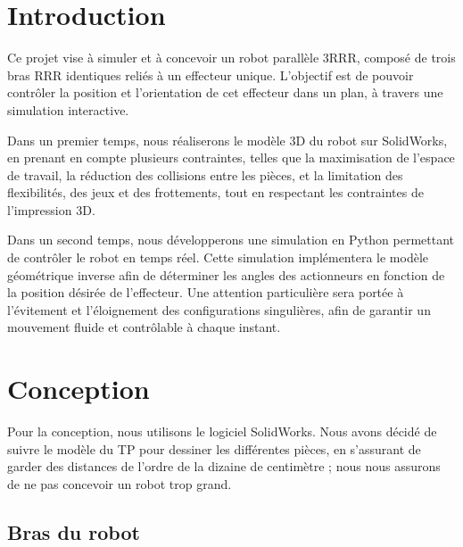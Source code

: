 \documentclass[a4paper, 11pt]{report}
\begin{document}

\clearpage\setcounter{page}{2}

\tableofcontents

\section*{Introduction}

Ce projet vise à simuler et à concevoir un robot parallèle 3RRR, composé de trois bras RRR identiques reliés à un effecteur unique. L'objectif est de pouvoir contrôler la position et l'orientation de cet effecteur dans un plan, à travers une simulation interactive.

Dans un premier temps, nous réaliserons le modèle 3D du robot sur SolidWorks, en prenant en compte plusieurs contraintes, telles que la maximisation de l'espace de travail, la réduction des collisions entre les pièces, et la limitation des flexibilités, des jeux et des frottements, tout en respectant les contraintes de l'impression 3D.

Dans un second temps, nous développerons une simulation en Python permettant de contrôler le robot en temps réel. Cette simulation implémentera le modèle géométrique inverse afin de déterminer les angles des actionneurs en fonction de la position désirée de l'effecteur. Une attention particulière sera portée à l'évitement et l'éloignement des configurations singulières, afin de garantir un mouvement fluide et contrôlable à chaque instant.

\section{Conception}

Pour la conception, nous utilisons le logiciel SolidWorks. Nous avons décidé de suivre le modèle du TP pour dessiner les différentes pièces, 
en s'assurant de garder des distances de l'ordre de la dizaine de centimètre ; nous nous assurons de ne pas concevoir un robot trop grand.

\subsection{Bras du robot}
\end{document}
